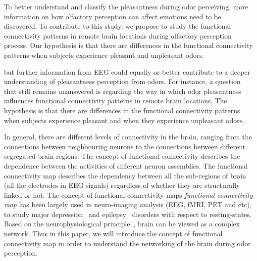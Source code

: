 To better understand and classify the pleasantness during odor perceiving, more information on how olfactory perception can affect emotions need to be discovered. To contribute to this study, we propose to study the functional connectivity patterns in remote brain locations during olfactory perception process. Our hypothesis is that there are differences in the functional connectivity patterns when subjects experience pleasant and unpleasant odors. 

 but further information from EEG could equally or better contribute to a deeper understanding of pleasantness perception from odors. For instance, a question that still remains unanswered is regarding the way in which odor pleasantness influences functional connectivity patterns in remote brain locations. The hypothesis is that there are differences in the functional connectivity patterns when subjects experience pleasant and when they experience unpleasant odors. 


In general, there are different levels of connectivity in the brain, ranging from the connections between neighbouring neurons to the connections between different segregated brain regions. The concept of functional connectivity describes the dependence between the activities of different neuron assemblies. The functional connectivity map describes the dependency between all the sub-regions of brain (all the electrodes in EEG signals) regardless of whether they are structurally linked or not. The concept of functional connectivity maps \emph{functional connectivity map} has been largely used in neuro-imaging analysis (EEG, fMRI, PET and etc), to study major depression~\cite{greicius2007resting} and epilepsy~\cite{waites2006functional} disorders with respect to resting-states. Based on the neurophysiological principle~\cite{van2010exploring}, brain can be viewed as a complex network. Thus in this paper, we will introduce the concept of functional connectivity map in order to understand the networking of the brain during odor perception.

